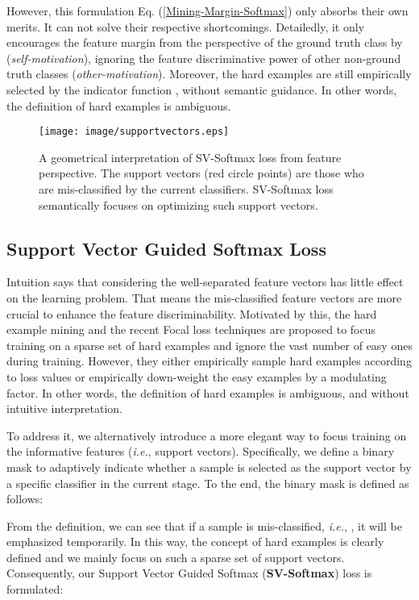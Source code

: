 \documentclass[10pt,twocolumn,letterpaper]{article}
\begin{document}
However, this formulation Eq. (\ref{Mining-Margin-Softmax}) only absorbs their own merits. It can not solve their respective shortcomings. Detailedly, it only encourages the feature margin from the perspective of the ground truth class by  (\textit{self-motivation}), ignoring the feature discriminative power of other non-ground truth classes (\textit{other-motivation}). Moreover, the hard examples are still empirically selected by the indicator function , without semantic guidance. In other words, the definition of hard examples is ambiguous.

\begin{figure}[t]
\begin{center}
\texttt{[image: image/supportvectors.eps]}
\end{center}
   \caption{A geometrical interpretation of SV-Softmax loss from feature perspective. The support vectors (red circle points) are those who are mis-classified by the current classifiers. SV-Softmax loss semantically focuses on optimizing such support vectors.}
\label{fig:sv-softmax}
\end{figure}

\subsection{Support Vector Guided Softmax Loss}
Intuition says that considering the well-separated feature vectors has little effect on the learning problem. That means the mis-classified feature vectors are more crucial to enhance the feature discriminability. Motivated by this, the hard example mining \cite{OHEM} and the recent Focal loss \cite{Focal} techniques are proposed to focus training on a sparse set of hard examples and ignore the vast number of easy ones during training. However, they either empirically sample hard examples according to loss values or empirically down-weight the easy examples by a modulating factor. In other words, the definition of hard examples is ambiguous, and without intuitive interpretation.

To address it, we alternatively introduce a more elegant way to focus training on the informative features (\textit{i.e.}, support vectors). Specifically, we define a binary mask to adaptively indicate whether a sample is selected as the support vector by a specific classifier in the current stage. To the end, the binary mask is defined as follows:

From the definition, we can see that if a sample is mis-classified, \textit{i.e.}, , it will be emphasized temporarily. In this way, the concept of hard examples is clearly defined and we mainly focus on such a sparse set of support vectors. Consequently, our Support Vector Guided Softmax (\textbf{SV-Softmax}) loss is formulated:
\end{document}

